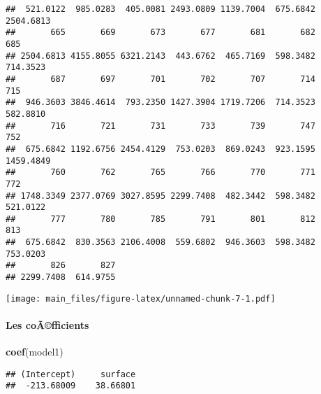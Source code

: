 \documentclass[]{article}
\newenvironment{Shaded}{\begin{snugshade}}{\end{snugshade}}
\newcommand{\KeywordTok}[1]{\textcolor[rgb]{0.13,0.29,0.53}{\textbf{#1}}}
\newcommand{\DataTypeTok}[1]{\textcolor[rgb]{0.13,0.29,0.53}{#1}}
\newcommand{\DecValTok}[1]{\textcolor[rgb]{0.00,0.00,0.81}{#1}}
\newcommand{\StringTok}[1]{\textcolor[rgb]{0.31,0.60,0.02}{#1}}
\newcommand{\OperatorTok}[1]{\textcolor[rgb]{0.81,0.36,0.00}{\textbf{#1}}}
\newcommand{\NormalTok}[1]{#1}
\let\oldparagraph\paragraph
\renewcommand{\paragraph}[1]{\oldparagraph{#1}\mbox{}}
\begin{document}
\begin{verbatim}
##  521.0122  985.0283  405.0081 2493.0809 1139.7004  675.6842 2504.6813 
##       665       669       673       677       681       682       685 
## 2504.6813 4155.8055 6321.2143  443.6762  465.7169  598.3482  714.3523 
##       687       697       701       702       707       714       715 
##  946.3603 3846.4614  793.2350 1427.3904 1719.7206  714.3523  582.8810 
##       716       721       731       733       739       747       752 
##  675.6842 1192.6756 2454.4129  753.0203  869.0243  923.1595 1459.4849 
##       760       762       765       766       770       771       772 
## 1748.3349 2377.0769 3027.8595 2299.7408  482.3442  598.3482  521.0122 
##       777       780       785       791       801       812       813 
##  675.6842  830.3563 2106.4008  559.6802  946.3603  598.3482  753.0203 
##       826       827 
## 2299.7408  614.9755
\end{verbatim}

\begin{Shaded}
\end{Shaded}

\texttt{[image: main\_files/figure-latex/unnamed-chunk-7-1.pdf]}

\paragraph{Les coÃ©fficients}\label{les-coafficients}

\begin{Shaded}
\begin{Highlighting}[]
\KeywordTok{coef}\NormalTok{(model1)}
\end{Highlighting}
\end{Shaded}

\begin{verbatim}
## (Intercept)     surface 
##  -213.68009    38.66801
\end{verbatim}
\end{document}
